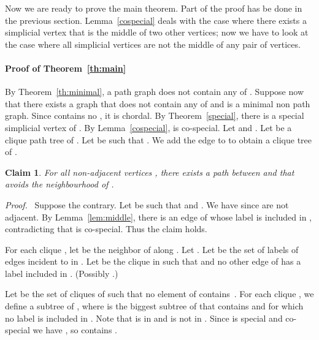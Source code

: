 \documentclass[11pt]{article}
\newtheorem{claim}{Claim}
\newenvironment{proofcl}{\noindent \emph{Proof.}\ }{Thus the claim
holds.  \hfill \vspace{1em}}
\begin{document}
Now we are ready to prove the main theorem.  Part of the proof has be
done in the previous section.  Lemma~\ref{cospecial} deals with the
case where there exists a simplicial vertex that is the middle of two
other vertices; now we have to look at the case where all simplicial
vertices are not the middle of any pair of vertices.

\paragraph*{Proof of Theorem~\ref{th:main}}
\setcounter{claim}{0}

By Theorem~\ref{th:minimal}, a path graph does not contain any of
.  Suppose now that there exists a graph  that
does not contain any of  and is a minimal non
path graph.  Since  contains no , it is chordal.  By
Theorem~\ref{special}, there is a special simplicial vertex  of
.  By Lemma~\ref{cospecial},  is co-special.  Let  and
.  Let  be a clique path tree of
.  Let  be such
that .  We add the edge  to  to obtain a
clique tree  of .

\begin{claim}\label{clq}
     For all non-adjacent vertices , there exists a path
     between  and  that avoids the neighbourhood of .
\end{claim}
\begin{proofcl}
Suppose the contrary.  Let  be such that 
and .  We have  since  are not adjacent.  By
Lemma~\ref{lem:middle}, there is an edge of  whose label is
included in , contradicting that  is co-special.
\end{proofcl}

For each clique , let  be the
neighbor of  along .  Let .  Let
 be the set of labels of edges incident to  in .
Let  be the clique in  such
that  and no other edge of
 has a label included in .  (Possibly
.)

Let  be the set of cliques  of  such that no element of 
contains~.  For each clique , we
define a subtree  of , where  is the biggest subtree
of  that contains  and for which no label is included in
.  Note that  is in  and  is not
in .  Since  is special and co-special we have , so  contains .
\end{document}
